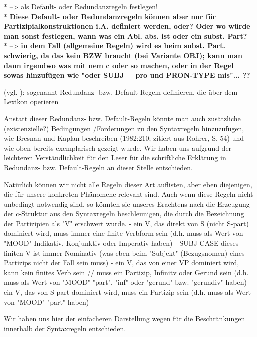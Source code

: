 \documentclass[12pt,a4paper]{article}
\begin{document}
* --> als Default- oder Redundanzregeln festlegen! \\
* \textbf{Diese Default- oder Redundanzregeln können aber nur für Partizipialkonstruktionen i.A. definiert werden, oder? Oder wo würde man sonst festlegen, wann was ein Abl. abs. ist oder ein subst. Part?} \\
* --> \textbf{in dem Fall (allgemeine Regeln) wird es beim subst. Part. schwierig, da das kein BZW braucht (bei Variante OBJ); kann man dann irgendwo was mit nem c oder so machen, oder in der Regel sowas hinzufügen wie "oder SUBJ = pro und PRON-TYPE mis"... ??} \\
\newline

(vgl. \cite[S. 23-4]{Rohrer}):
sogenannt Redundanz- bzw. Default-Regeln definieren, die über dem Lexikon operieren

Anstatt dieser Redundanz- bzw. Default-Regeln könnte man auch zusätzliche (existenzielle?) Bedingungen /Forderungen zu den Syntaxregeln hinzuzufügen, wie Bresnan und Kaplan beschreiben (1982:210; zitiert aus Rohrer, S. 54) und wie oben bereits exemplarisch gezeigt wurde. Wir haben uns aufgrund der leichteren Verständlichkeit für den Leser für die schriftliche Erklärung in Redundanz- bzw. Default-Regeln an dieser Stelle entschieden.

Natürlich können wir nicht alle Regeln dieser Art auflisten, aber eben diejenigen, die für unsere konkreten
Phänomene relevant sind.
Auch wenn diese Regeln nicht unbedingt notwendig sind, so könnten sie
unseres Erachtens nach die Erzeugung der c-Struktur aus den Syntaxregeln
beschleunigen, die durch die Bezeichnung der Partizipien als "V" erschwert
wurde.
- ein V, das direkt von S (nicht S-part) dominiert wird, muss immer eine
finite Verbform sein (d.h. muss als Wert von "MOOD" Indikativ, Konjunktiv oder
 Imperativ haben)
- SUBJ CASE dieses finiten V ist immer Nominativ (was eben beim "Subjekt"
(Bezugsnomen) eines Partizips nicht der Fall sein muss)
- ein V, das von einer VP dominiert wird, kann kein finites Verb sein //
muss ein Partizip, Infinitv oder Gerund sein (d.h. muss als Wert von "MOOD"
"part", "inf" oder "gerund" bzw. "gerundiv" haben)
- ein V, das von S-part dominiert wird, muss ein Partizip sein (d.h. muss
als Wert von "MOOD" "part" haben)

Wir haben uns hier der einfacheren Darstellung wegen für die Beschränkungen innerhalb der Syntaxregeln entschieden.
\newline
\newline
\end{document}
